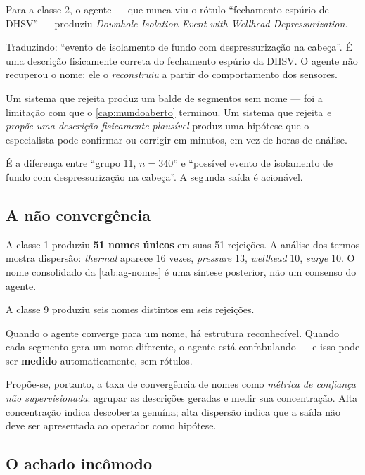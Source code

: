 Para a classe 2, o agente --- que nunca viu o rótulo ``fechamento espúrio de DHSV'' ---
produziu \emph{Downhole Isolation Event with Wellhead Depressurization}.

Traduzindo: ``evento de isolamento de fundo com despressurização na cabeça''. É uma
descrição fisicamente correta do fechamento espúrio da DHSV. O agente não recuperou o
nome; ele o \emph{reconstruiu} a partir do comportamento dos sensores.

\begin{destaque}
Um sistema que rejeita produz um balde de segmentos sem nome --- foi a limitação com que
o \cref{cap:mundoaberto} terminou. Um sistema que rejeita \emph{e propõe uma descrição
fisicamente plausível} produz uma hipótese que o especialista pode confirmar ou corrigir
em minutos, em vez de horas de análise.

É a diferença entre ``grupo 11, $n = 340$'' e ``possível evento de isolamento de fundo
com despressurização na cabeça''. A segunda saída é acionável.
\end{destaque}

\subsection{A não convergência}

A classe 1 produziu \textbf{51 nomes únicos} em suas 51 rejeições. A análise dos termos
mostra dispersão: \emph{thermal} aparece 16 vezes, \emph{pressure} 13, \emph{wellhead}
10, \emph{surge} 10. O nome consolidado da \cref{tab:ag-nomes} é uma síntese posterior,
não um consenso do agente.

A classe 9 produziu seis nomes distintos em seis rejeições.

\begin{destaque}
Quando o agente converge para um nome, há estrutura reconhecível. Quando cada segmento
gera um nome diferente, o agente está confabulando --- e isso pode ser \textbf{medido}
automaticamente, sem rótulos.

Propõe-se, portanto, a taxa de convergência de nomes como \emph{métrica de confiança não
supervisionada}: agrupar as descrições geradas e medir sua concentração. Alta
concentração indica descoberta genuína; alta dispersão indica que a saída não deve ser
apresentada ao operador como hipótese.
\end{destaque}

\subsection{O achado incômodo}

